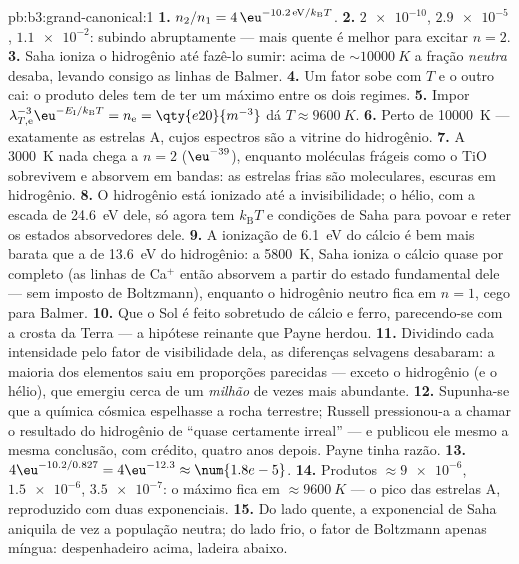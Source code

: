 \begin{solution}{pb:b3:grand-canonical:1}
\textbf{1.} $n_2/n_1 = 4\,\eu^{-10.2\,\text{eV}/k_{\text{B}}T}$.
\textbf{2.} $\num{2e-10}$, $\num{2.9e-5}$, $\num{1.1e-2}$: subindo
abruptamente --- mais quente é melhor para excitar $n = 2$.
\textbf{3.} Saha ioniza o hidrogênio até fazê-lo sumir: acima de
$\sim\qty{10000}{K}$ a fração \emph{neutra} desaba, levando
consigo as linhas de Balmer.
\textbf{4.} Um fator sobe com $T$ e o outro cai: o produto
deles tem de ter um máximo entre os dois regimes.
\textbf{5.} Impor $\lambda_{T,\text{e}}^{-3}\eu^{-E_{\text{I}}/
k_{\text{B}}T} = n_{\text{e}} = \qty{e20}{m^{-3}}$ dá $T
\approx \qty{9600}{K}$.
\textbf{6.} Perto de \qty{10000}{K} --- exatamente as estrelas A, cujos
espectros são a vitrine do hidrogênio.
\textbf{7.} A \qty{3000}{K} nada chega a $n = 2$
($\eu^{-39}$), enquanto moléculas frágeis como o TiO sobrevivem e
absorvem em bandas: as estrelas frias são moleculares, escuras em
hidrogênio.
\textbf{8.} O hidrogênio está ionizado até a invisibilidade; o hélio,
com a escada de \qty{24.6}{eV} dele, só agora tem $k_{\text{B}}T$ e
condições de Saha para povoar e reter os estados absorvedores dele.
\textbf{9.} A ionização de \qty{6.1}{eV} do cálcio é bem mais barata
que a de \qty{13.6}{eV} do hidrogênio: a \qty{5800}{K}, Saha ioniza o
cálcio quase por completo (as linhas de Ca$^+$ então absorvem a partir
do estado fundamental dele --- sem imposto de Boltzmann), enquanto o
hidrogênio neutro fica em $n = 1$, cego para Balmer.
\textbf{10.} Que o Sol é feito sobretudo de cálcio e ferro, parecendo-se
com a crosta da Terra --- a hipótese reinante que Payne herdou.
\textbf{11.} Dividindo cada intensidade pelo fator de visibilidade
dela, as diferenças selvagens desabaram: a maioria dos elementos saiu
em proporções parecidas --- exceto o hidrogênio (e o hélio), que
emergiu cerca de um \emph{milhão} de vezes mais abundante.
\textbf{12.} Supunha-se que a química cósmica espelhasse a rocha
terrestre; Russell pressionou-a a chamar o resultado do hidrogênio de
``quase certamente irreal'' --- e publicou ele mesmo a mesma conclusão,
com crédito, quatro anos depois. Payne tinha razão.
\textbf{13.} $4\eu^{-10.2/0.827} = 4\eu^{-12.3} \approx
\num{1.8e-5}$.
\textbf{14.} Produtos $\approx \num{9e-6}$, $\num{1.5e-6}$,
$\num{3.5e-7}$: o máximo fica em $\approx\qty{9600}{K}$ --- o
pico das estrelas A, reproduzido com duas exponenciais.
\textbf{15.} Do lado quente, a exponencial de Saha aniquila de vez a
população neutra; do lado frio, o fator de Boltzmann apenas
míngua: despenhadeiro acima, ladeira abaixo.

\end{solution}
